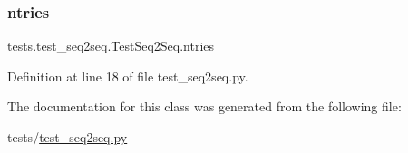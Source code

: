 \subsubsection{\texorpdfstring{ntries}{ntries}}
{\footnotesize\ttfamily tests.\+test\+\_\+seq2seq.\+Test\+Seq2\+Seq.\+ntries\hspace{0.3cm}{\ttfamily [static]}}



Definition at line 18 of file test\+\_\+seq2seq.\+py.



The documentation for this class was generated from the following file\+:\begin{DoxyCompactItemize}
\item 
tests/\hyperlink{test__seq2seq_8py}{test\+\_\+seq2seq.\+py}\end{DoxyCompactItemize}
